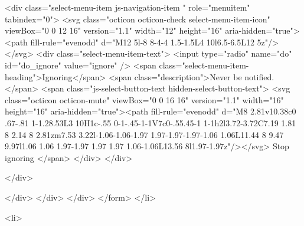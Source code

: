                <div class="select-menu-item js-navigation-item " role="menuitem" tabindex="0">
                  <svg class="octicon octicon-check select-menu-item-icon" viewBox="0 0 12 16" version="1.1" width="12" height="16" aria-hidden="true"><path fill-rule="evenodd" d="M12 5l-8 8-4-4 1.5-1.5L4 10l6.5-6.5L12 5z"/></svg>
                  <div class="select-menu-item-text">
                    <input type="radio" name="do" id="do_ignore" value="ignore" />
                    <span class="select-menu-item-heading">Ignoring</span>
                    <span class="description">Never be notified.</span>
                    <span class="js-select-button-text hidden-select-button-text">
                      <svg class="octicon octicon-mute" viewBox="0 0 16 16" version="1.1" width="16" height="16" aria-hidden="true"><path fill-rule="evenodd" d="M8 2.81v10.38c0 .67-.81 1-1.28.53L3 10H1c-.55 0-1-.45-1-1V7c0-.55.45-1 1-1h2l3.72-3.72C7.19 1.81 8 2.14 8 2.81zm7.53 3.22l-1.06-1.06-1.97 1.97-1.97-1.97-1.06 1.06L11.44 8 9.47 9.97l1.06 1.06 1.97-1.97 1.97 1.97 1.06-1.06L13.56 8l1.97-1.97z"/></svg>
                        Stop ignoring
                    </span>
                  </div>
                </div>

              </div>

            </div>
          </div>
        </div>
</form>
  </li>

  <li>
    

